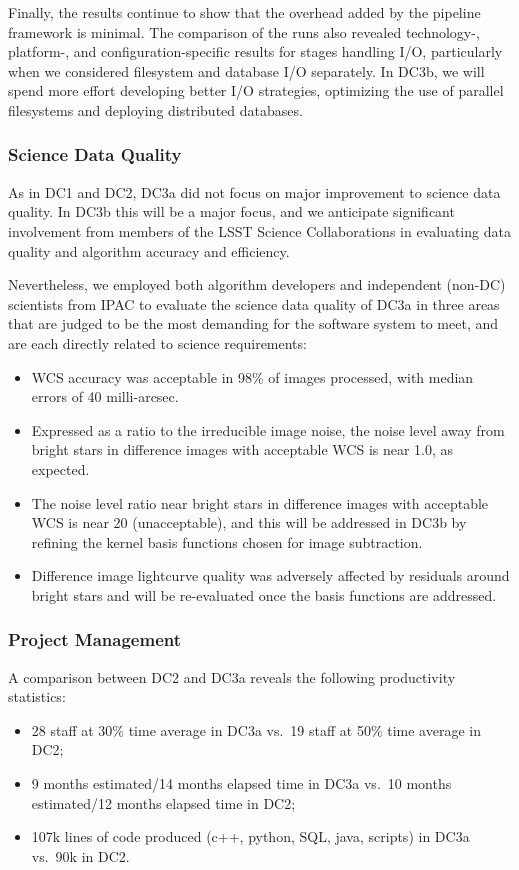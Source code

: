 Finally, the results continue to show that the overhead 
added by the  pipeline framework is minimal.
The comparison of the runs also revealed technology-, platform-, and configuration-specific results for stages
handling I/O, particularly when we considered filesystem and database
I/O separately. In DC3b, we will spend more effort developing better I/O
strategies, optimizing the use of parallel filesystems and deploying distributed databases.  

\subsubsection*{Science Data Quality}
As in DC1 and DC2, DC3a did not focus on major improvement to science data quality.  
In DC3b this will be a major focus, and we anticipate significant involvement from
members of the LSST Science Collaborations in evaluating data quality and algorithm accuracy
and efficiency.

Nevertheless, we employed both algorithm developers and independent
 (non-DC) scientists from IPAC
to evaluate the science data quality of DC3a in three areas that are
judged to be the most demanding for the software system to meet, 
and are each directly related to science requirements:
\begin{itemize}
\item WCS accuracy was acceptable in 98\% of images processed, with median errors of 40 milli-arcsec.
\item Expressed as a ratio to the irreducible image noise, the noise level away from bright stars in difference images with acceptable WCS is near 1.0, as expected.
\item The noise level ratio near bright stars in difference images with acceptable WCS is near 20 (unacceptable), and this will be addressed in DC3b by refining the kernel basis functions chosen for image subtraction.
\item Difference image lightcurve quality was adversely affected by residuals around bright stars and will be re-evaluated once the basis functions are addressed.
\end{itemize}

\subsubsection*{Project Management}
A comparison between DC2 and DC3a reveals the following productivity statistics:
\begin{itemize}
\item 28 staff at 30\% time average in DC3a vs.~19 staff at 50\% time average in DC2;
\item 9 months estimated/14 months elapsed time in DC3a vs.~10 months estimated/12 months elapsed time in DC2;
\item 107k lines of code produced (c++, python, SQL, java, scripts) in DC3a vs.~90k in DC2.
\end{itemize}

